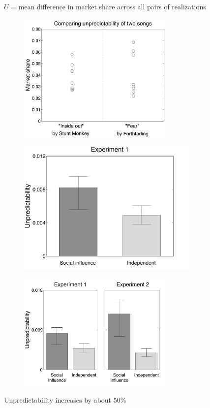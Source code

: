 \documentclass[aspectratio=169]{beamer}
\begin{document}
\begin{frame}

$U$ = mean difference in market share across all pairs of realizations\\
\begin{figure}
  \centering
  \includegraphics[width = 3in]{figures/arbitrary_example}
\end{figure}

\end{frame}
\begin{frame}

\begin{figure}
  \centering
  \includegraphics[width = 3.5in]{figures/unpredictability_v1}
\end{figure}

\end{frame}
\begin{frame}

\begin{figure}
  \centering
  \includegraphics[width=3in]{figures/compare_unpred_v1v2}
\end{figure}

Unpredictability increases by about 50\%
\end{frame}
\end{document}

